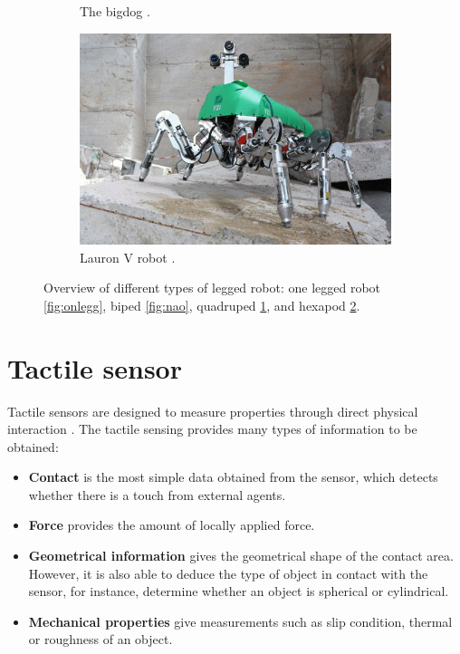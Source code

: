 \documentclass[USenglish]{ifimaster}  %
\begin{document}
\begin{figure}
\begin{subfigure}[b]{0.22\textwidth}
		\caption{The bigdog \cite{Raibert200810822}.}
		\label{fig:bigDog}
	\end{subfigure}\hfill
	\begin{subfigure}[b]{0.22\textwidth}
		\centering
		\includegraphics[width=\linewidth]{Figures/Lauron}
		\caption{Lauron V robot \cite{6878051}.}
		\label{fig:LAURON}
	\end{subfigure}
	\caption[Overview of different types of legged robot]{Overview of different types of legged robot: one legged robot \ref{fig:onlegg},  biped \ref{fig:nao}, quadruped \ref{fig:bigDog}, and hexapod \ref{fig:LAURON}. }
	\label{fig:robots}
\end{figure}

\FloatBarrier


\section{Tactile sensor}
Tactile sensors are designed to measure properties through direct physical interaction \cite{Cutkosky2008}. The tactile sensing provides many types of information to be obtained:

\begin{itemize}
	\item \textbf{Contact} is the most simple data obtained from the sensor, which detects whether there is a touch from external agents. 
	\item \textbf{Force} provides the amount of locally applied force.
	\item \textbf{Geometrical information} gives the geometrical shape of the contact area. However, it is also able to deduce the type of object in contact with the sensor, for instance, determine whether an object is spherical or cylindrical.
	\item \textbf{Mechanical properties} give measurements such as slip condition, thermal or roughness of an object.
\end{itemize}
\end{document}
